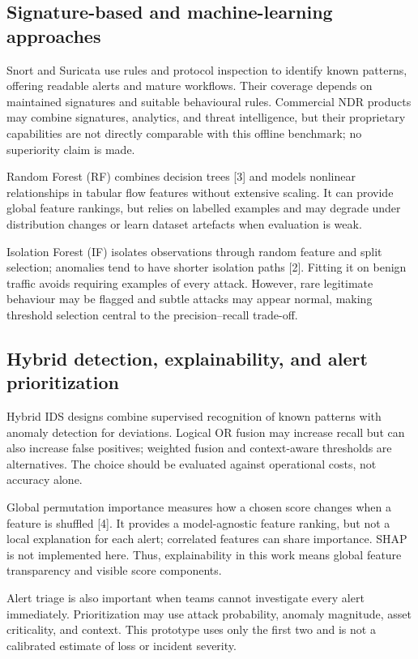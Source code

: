 \documentclass[runningheads]{llncs}
\begin{document}
\subsection{Signature-based and machine-learning approaches}
Snort and Suricata use rules and protocol inspection to identify known patterns, offering readable alerts and mature workflows. Their coverage depends on maintained signatures and suitable behavioural rules. Commercial NDR products may combine signatures, analytics, and threat intelligence, but their proprietary capabilities are not directly comparable with this offline benchmark; no superiority claim is made.

Random Forest (RF) combines decision trees [3] and models nonlinear relationships in tabular flow features without extensive scaling. It can provide global feature rankings, but relies on labelled examples and may degrade under distribution changes or learn dataset artefacts when evaluation is weak.

Isolation Forest (IF) isolates observations through random feature and split selection; anomalies tend to have shorter isolation paths [2]. Fitting it on benign traffic avoids requiring examples of every attack. However, rare legitimate behaviour may be flagged and subtle attacks may appear normal, making threshold selection central to the precision--recall trade-off.

\subsection{Hybrid detection, explainability, and alert prioritization}
Hybrid IDS designs combine supervised recognition of known patterns with anomaly detection for deviations. Logical OR fusion may increase recall but can also increase false positives; weighted fusion and context-aware thresholds are alternatives. The choice should be evaluated against operational costs, not accuracy alone.

Global permutation importance measures how a chosen score changes when a feature is shuffled [4]. It provides a model-agnostic feature ranking, but not a local explanation for each alert; correlated features can share importance. SHAP is not implemented here. Thus, explainability in this work means global feature transparency and visible score components.

Alert triage is also important when teams cannot investigate every alert immediately. Prioritization may use attack probability, anomaly magnitude, asset criticality, and context. This prototype uses only the first two and is not a calibrated estimate of loss or incident severity.
\end{document}
